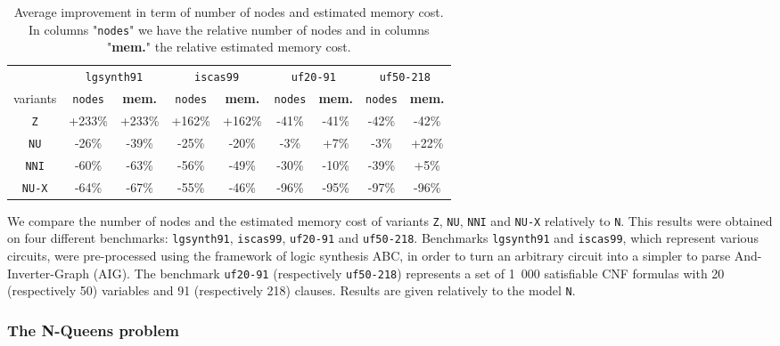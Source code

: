 \documentclass[a4paper,10pt]{article}
\begin{document}
\begin{table}
\center
\small
\begin{tabular}{c | c | c | c | c | c | c | c | c}
& \multicolumn{2}{c|}{\texttt{lgsynth91}} & \multicolumn{2}{c|}{\texttt{iscas99}} & \multicolumn{2}{c|}{\texttt{uf20-91}} & \multicolumn{2}{c}{\texttt{uf50-218}} \\
variants      & \texttt{nodes} & \textbf{mem.} & \texttt{nodes} & \textbf{mem.} & \texttt{nodes} & \textbf{mem.} & \texttt{nodes} & \textbf{mem.} \\
\texttt{Z}    & +233\% & +233\%        & +162\% & +162\%        & -41\%  & -41\%         & -42\%  & -42\%        \\
\texttt{NU}   & -26\%  & -39\%         & -25\%  & -20\%         & -3\%   & +7\%          & -3\%  & +22\%        \\
\texttt{NNI}  & -60\%  & -63\%         & -56\%  & -49\%         & -30\%  & -10\%         & -39\%  & +5\%        \\
\texttt{NU-X} & -64\%  & -67\%         & -55\%  & -46\%         & -96\%  & -95\%         & -97\%  & -96\%        \\
\end{tabular}
\caption{Average improvement in term of number of nodes and estimated memory cost.
In columns "\texttt{nodes}" we have the relative number of nodes and in columns "\textbf{mem.}" the relative estimated memory cost.
}
\label{results}
\end{table}

We compare the number of nodes and the estimated memory cost of variants \texttt{Z}, \texttt{NU}, \texttt{NNI} and \texttt{NU-X} relatively to \texttt{N}.
This results were obtained on four different benchmarks: \texttt{lgsynth91}\cite{BenchLgsynth91}, \texttt{iscas99}\cite{BenchIscas99}, \texttt{uf20-91}\cite{BenchSatlib} and \texttt{uf50-218}\cite{BenchSatlib}.
Benchmarks \texttt{lgsynth91} and \texttt{iscas99}, which represent various circuits, were pre-processed using the framework of logic synthesis ABC\cite{Abc}, in order to turn an arbitrary circuit into a simpler to parse And-Inverter-Graph (AIG).
The benchmark \texttt{uf20-91} (respectively \texttt{uf50-218}) represents a set of 1~000 satisfiable CNF formulas with 20 (respectively 50) variables and 91 (respectively 218) clauses.
Results are given relatively to the model \texttt{N}.


\subsubsection{The N-Queens problem}
\end{document}
